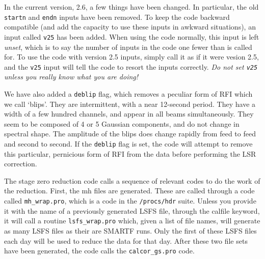 \documentclass[11pt]{article}
\begin{document}
In the current version, 2.6, a few things have been changed. In particular, the old \texttt{startn} and \texttt{endn} inputs have been removed. To keep the code backward compatible (and add the capacity to use these inputs in awkward situations), an input called \texttt{v25} has been added. When using the code normally, this input is left \emph{unset}, which is to say the number of inputs in the code one fewer than is called for. To use the code with version 2.5 inputs, simply call it as if it were vesion 2.5, and the \texttt{v25} input will tell the code to resort the inputs correctly. \emph{Do not set \texttt{v25} unless you really know what you are doing!}

We have also added a \texttt{deblip} flag, which removes a peculiar form of RFI which we call `blips'. They are intermittent, with a near 12-second period. They have a width of a few hundred channels, and appear in all beams simultaneously. They seem to be composed of 4 or 5 Gaussian components, and do not change in spectral shape. The amplitude of the blips does change rapidly from feed to feed and second to second. If the \texttt{deblip} flag is set, the code will attempt to remove this particular, pernicious form of RFI from the data before performing the LSR correction.


The stage zero reduction code calls a sequence of relevant codes to do the work of the reduction. First, the mh files are generated. These are called through a code called \texttt{mh\_wrap.pro}, which is a code in the \texttt{/procs/hdr} suite. Unless you provide it with the name of a previously generated LSFS file, through the calfile keyword, it will call a routine \texttt{lsfs\_wrap.pro} which, given a list of file names, will generate as many LSFS files as their are SMARTF runs. Only the first of these LSFS files each day will be used to reduce the data for that day. After these two file sets have been generated, the code calls the \texttt{calcor\_gs.pro} code.
\end{document}
